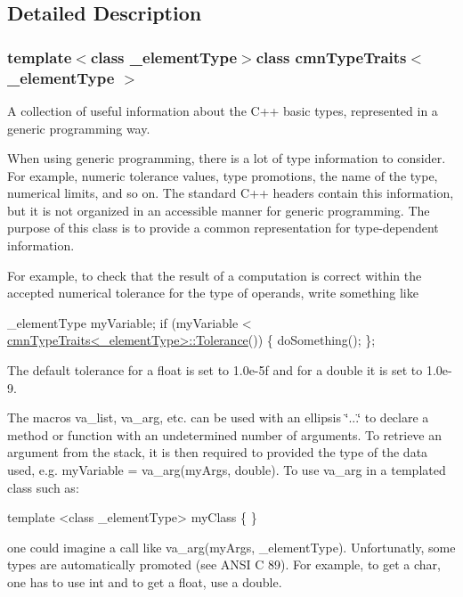 \subsection{Detailed Description}
\subsubsection*{template$<$class \-\_\-element\-Type$>$class cmn\-Type\-Traits$<$ \-\_\-element\-Type $>$}

A collection of useful information about the C++ basic types, represented in a generic programming way. 

When using generic programming, there is a lot of type information to consider. For example, numeric tolerance values, type promotions, the name of the type, numerical limits, and so on. The standard C++ headers contain this information, but it is not organized in an accessible manner for generic programming. The purpose of this class is to provide a common representation for type-\/dependent information.

For example, to check that the result of a computation is correct within the accepted numerical tolerance for the type of operands, write something like 
\begin{DoxyCode}
\_elementType myVariable;
\textcolor{keywordflow}{if} (myVariable < \hyperlink{classcmn_type_traits}{cmnTypeTraits<\_elementType>::Tolerance}()) \{
    doSomething();
\};
\end{DoxyCode}


The default tolerance for a float is set to 1.\-0e-\/5f and for a double it is set to 1.\-0e-\/9.

The macros va\-\_\-list, va\-\_\-arg, etc. can be used with an ellipsis \char`\"{}...\char`\"{} to declare a method or function with an undetermined number of arguments. To retrieve an argument from the stack, it is then required to provided the type of the data used, e.\-g. my\-Variable = va\-\_\-arg(my\-Args, double). To use va\-\_\-arg in a templated class such as\-:


\begin{DoxyCode}
\textcolor{keyword}{template} <\textcolor{keyword}{class} \_elementType>
myClass \{
\}
\end{DoxyCode}


one could imagine a call like va\-\_\-arg(my\-Args, \-\_\-element\-Type). Unfortunatly, some types are automatically promoted (see A\-N\-S\-I C 89). For example, to get a char, one has to use int and to get a float, use a double.


